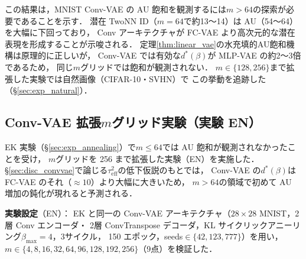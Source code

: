 \documentclass[11pt,a4paper]{jsarticle}
\begin{document}
この結果は，MNIST Conv-VAE の AU 飽和を観測するには$m > 64$の探索が必要であることを示す．
潜在 TwoNN ID（$m=64$で約13〜14）は AU（54〜64）を大幅に下回っており，
Conv アーキテクチャが FC-VAE より高次元的な潜在表現を形成することが示唆される．
定理\ref{thm:linear_vae}の水充填的AU飽和機構は原理的に正しいが，
Conv-VAE では有効な$d^*(\beta)$が MLP-VAE の約2〜3倍であるため，
同じ$m$グリッドでは飽和が観測されない．
$m \in \{128, 256\}$まで拡張した実験では自然画像（CIFAR-10・SVHN）で
この挙動を追跡した（§\ref{sec:exp_natural}）．

\subsection{Conv-VAE 拡張$m$グリッド実験（実験 EN）}\label{sec:exp_en}

EK 実験（§\ref{sec:exp_annealing}）で$m \leq 64$では AU 飽和が観測されなかったことを受け，
$m$グリッドを 256 まで拡張した実験（EN）を実施した．
§\ref{sec:disc_convvae}で論じる$\tau^2_\mathrm{eff}$の低下仮説のもとでは，
Conv-VAE の$d^*(\beta)$は FC-VAE のそれ（$\approx 10$）より大幅に大きいため，
$m>64$の領域で初めて AU 増加の鈍化が現れると予測される．

\textbf{実験設定}（EN）：
EK と同一の Conv-VAE アーキテクチャ（$28\times28$ MNIST，2層 Conv エンコーダ・
2層 ConvTranspose デコーダ，KL サイクリックアニーリング$\beta_\mathrm{max}=4$，3サイクル，
150 エポック，seeds$\in\{42,123,777\}$）を用い，
$m \in \{4, 8, 16, 32, 64, 96, 128, 192, 256\}$（9点）を検証した．
\end{document}
